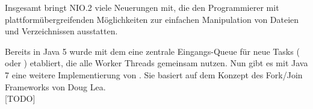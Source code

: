 \documentclass[times, 10pt,twocolumn]{article}
\begin{document}
Insgesamt bringt NIO.2 viele Neuerungen mit, die den Programmierer mit plattformübergreifenden Möglichkeiten zur einfachen
Manipulation von Dateien und Verzeichnissen ausstatten. 

Bereits in Java 5 wurde mit dem  eine zentrale Eingangs-Queue für neue Tasks ( oder ) etabliert, die alle Worker Threads gemeinsam nutzen. Nun gibt es mit Java 7 eine weitere Implementierung von . Sie basiert auf dem Konzept des Fork/Join Frameworks\cite{forkjoinpaper} von Doug Lea.\cite{forkjoinheise}\\

[TODO]


% 
% 
% 
% 
% 
% 
% 
% 




\jDocIndex
\end{document}
